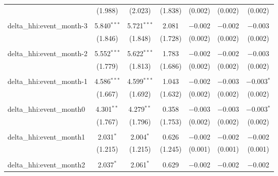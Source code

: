 \begin{table}[H]
{\begin{tabular}{@{\extracolsep{5pt}}lcccccc}
   & (1.988) & (2.023) & (1.838) & (0.002) & (0.002) & (0.002) \\  

   & & & & & & \\  

  delta\_hhi:event\_month-3 & 5.840$^{***}$ & 5.721$^{***}$ & 2.081 & $-$0.002 & $-$0.002 & $-$0.003 \\  

   & (1.846) & (1.848) & (1.728) & (0.002) & (0.002) & (0.002) \\  

   & & & & & & \\  

  delta\_hhi:event\_month-2 & 5.552$^{***}$ & 5.622$^{***}$ & 1.783 & $-$0.002 & $-$0.002 & $-$0.003 \\  

   & (1.779) & (1.813) & (1.686) & (0.002) & (0.002) & (0.002) \\  

   & & & & & & \\  

  delta\_hhi:event\_month-1 & 4.586$^{***}$ & 4.599$^{***}$ & 1.043 & $-$0.002 & $-$0.003 & $-$0.003$^{*}$ \\  

   & (1.667) & (1.692) & (1.632) & (0.002) & (0.002) & (0.002) \\  

   & & & & & & \\  

  delta\_hhi:event\_month0 & 4.301$^{**}$ & 4.279$^{**}$ & 0.358 & $-$0.003 & $-$0.003 & $-$0.003$^{*}$ \\  

   & (1.767) & (1.796) & (1.753) & (0.002) & (0.002) & (0.002) \\  

   & & & & & & \\  

  delta\_hhi:event\_month1 & 2.031$^{*}$ & 2.004$^{*}$ & 0.626 & $-$0.002 & $-$0.002 & $-$0.002 \\  

   & (1.215) & (1.215) & (1.245) & (0.001) & (0.001) & (0.001) \\  

   & & & & & & \\  

  delta\_hhi:event\_month2 & 2.037$^{*}$ & 2.061$^{*}$ & 0.629 & $-$0.002 & $-$0.002 & $-$0.002 \\  


\end{tabular}}
\end{table}
